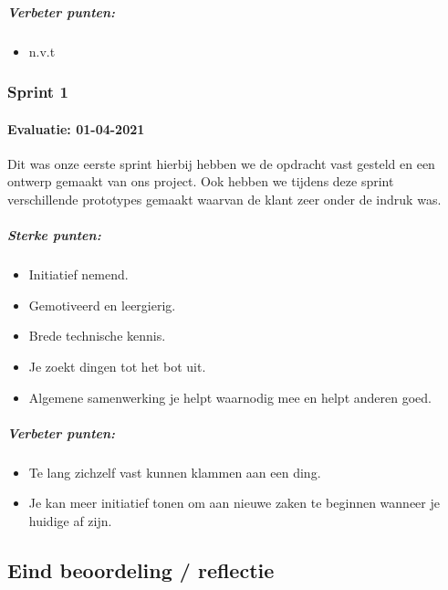 \subparagraph{Verbeter punten:}
\begin{itemize}
	\setlength{\itemsep}{0pt}%
	\setlength{\parskip}{0pt}%
	\item n.v.t
\end{itemize}

\newpage




\subsubsection{Sprint 1}
\paragraph{Evaluatie: 01-04-2021}
Dit was onze eerste sprint hierbij hebben we de opdracht vast gesteld en een ontwerp gemaakt van ons project.
Ook hebben we tijdens deze sprint verschillende prototypes gemaakt waarvan de klant zeer onder de indruk was.

\subparagraph{Sterke punten:}
\begin{itemize}
	\setlength{\itemsep}{0pt}%
	\setlength{\parskip}{0pt}%
	\item Initiatief nemend.
	\item Gemotiveerd en leergierig.
	\item Brede technische kennis.
	\item Je zoekt dingen tot het bot uit.
	\item Algemene samenwerking je helpt waarnodig mee en helpt anderen goed.
\end{itemize}

\subparagraph{Verbeter punten:}
\begin{itemize}
	\setlength{\itemsep}{0pt}%
	\setlength{\parskip}{0pt}%
	\item Te lang zichzelf vast kunnen klammen aan een ding.
	\item Je kan meer initiatief tonen om aan nieuwe zaken te beginnen wanneer je huidige af zijn.
\end{itemize}

\bigskip
\subsection{Eind beoordeling / reflectie}
%

